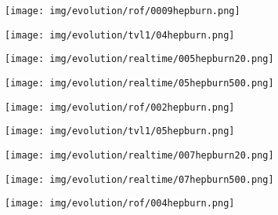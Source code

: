 \begin{figure}[ht]
\begin{center}
        \begin{subfigure}[b]{0.21\textwidth}
            \texttt{[image: img/evolution/rof/0009hepburn.png]}
        \end{subfigure}
        \begin{subfigure}[b]{0.21\textwidth}
            \texttt{[image: img/evolution/tvl1/04hepburn.png]}
        \end{subfigure}
        \begin{subfigure}[b]{0.21\textwidth}
            \texttt{[image: img/evolution/realtime/005hepburn20.png]}
        \end{subfigure}
        \begin{subfigure}[b]{0.21\textwidth}
            \texttt{[image: img/evolution/realtime/05hepburn500.png]}
        \end{subfigure}
    \end{center}
    \begin{center}
        \begin{subfigure}[b]{0.21\textwidth}
            \texttt{[image: img/evolution/rof/002hepburn.png]}
        \end{subfigure}
        \begin{subfigure}[b]{0.21\textwidth}
            \texttt{[image: img/evolution/tvl1/05hepburn.png]}
        \end{subfigure}
        \begin{subfigure}[b]{0.21\textwidth}
            \texttt{[image: img/evolution/realtime/007hepburn20.png]}
        \end{subfigure}
        \begin{subfigure}[b]{0.21\textwidth}
            \texttt{[image: img/evolution/realtime/07hepburn500.png]}
        \end{subfigure}
    \end{center}
    \begin{center}
        \begin{subfigure}[b]{0.21\textwidth}
            \texttt{[image: img/evolution/rof/004hepburn.png]}
        \end{subfigure}

\end{center}
\end{figure}
